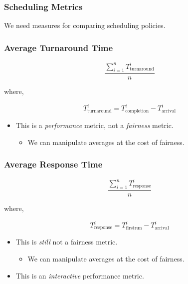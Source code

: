\begin{frame}

\frametitle{Scheduling Metrics}

\begin{center}

We need measures for comparing scheduling policies.

\end{center}

\end{frame}


\begin{frame}

\frametitle{Average Turnaround Time}

$$\frac{\sum_{i=1}^n T^i_{\text{turnaround}}}{n}$$

where,

$$T^i_{\text{turnaround}} = T^i_{\text{completion}} - T^i_{\text{arrival}}$$

\begin{itemize}


\item This is a \emph{performance} metric, not a \emph{fairness} metric.

\begin{itemize}

\item We can manipulate averages at the cost of fairness.

\end{itemize}

\end{itemize}

\end{frame}


\begin{frame}

\frametitle{Average Response Time}

$$\frac{\sum_{i=1}^n T^i_{\text{response}}}{n}$$

where,

$$T^i_{\text{response}} = T^i_{\text{firstrun}} - T^i_{\text{arrival}}$$

\begin{itemize}


\item This is \emph{still} not a fairness metric.

\begin{itemize}

\item We can manipulate averages at the cost of fairness.

\end{itemize}

\item This is an \emph{interactive} performance metric.

\end{itemize}

\end{frame}


